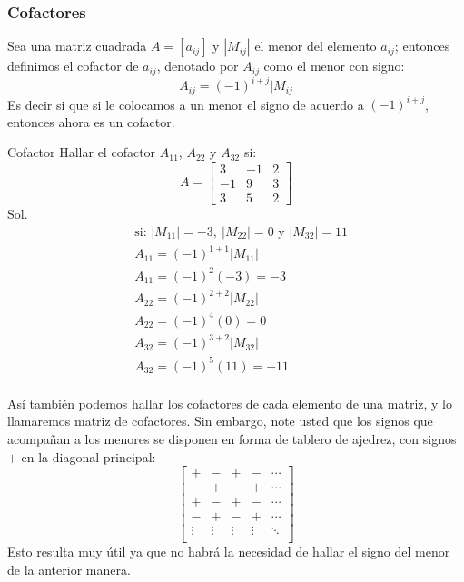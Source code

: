 \subsubsection*{Cofactores}
Sea una matriz cuadrada $A=[a_{ij}]$ y $|M_{ij}|$ el menor del elemento $a_{ij}$; entonces definimos el cofactor de $a_{ij}$, denotado por $A_{ij}$ como el menor con signo:
$$ A_{ij}=(-1)^{i+j}|M_{ij} $$
Es decir si que si le colocamos a un menor el signo de acuerdo a $(-1)^{i+j}$, entonces ahora es un cofactor.
\begin{Example*} {Cofactor}
	Hallar el cofactor $A_{11}$, $A_{22}$ y $A_{32}$ si:
	$$ A=\begin{bmatrix}
		3&-1&2\\
		-1&9&3\\
		3&5&2
	\end{bmatrix} $$
	Sol. \\
	\begin{align*}
		&\text{si: } |M_{11}|=-3, \ |M_{22}|=0\text{ y }|M_{32}|=11\\
		&A_{11}=(-1)^{1+1}|M_{11}|\\
		&A_{11}=(-1)^2(-3)=-3\\
		&A_{22}=(-1)^{2+2}|M_{22}|\\
		&A_{22}=(-1)^4(0)=0\\
		&A_{32}=(-1)^{3+2}|M_{32}|\\
		&A_{32}=(-1)^5(11)=-11\\
	\end{align*}
\end{Example*}
Así también podemos hallar los cofactores de cada elemento de una matriz, y lo llamaremos matriz de cofactores. Sin embargo, note usted que los signos que acompañan a los menores se disponen en forma de tablero de ajedrez, con signos $+$ en la diagonal principal:
$$ \begin{bmatrix}
	+&-&+&-&\cdots\\
	-&+&-&+&\cdots\\
	+&-&+&-&\cdots\\
	-&+&-&+&\cdots\\
	\vdots&\vdots&\vdots&\vdots&\ddots\\
\end{bmatrix} $$
Esto resulta muy útil ya que no habrá la necesidad de hallar el signo del menor de la anterior manera.
